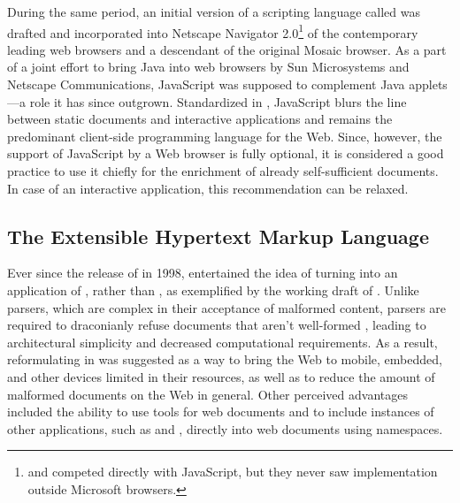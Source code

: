 \begin{figure}
\end{figure}

During the same period, an initial version of a scripting language called
 \cite{ecma97} was drafted and incorporated into Netscape
Navigator 2.0\footnote{
   and  competed directly with JavaScript, but they
  never saw implementation outside Microsoft browsers.
} of the contemporary leading web browsers and a descendant of the original
Mosaic browser. As a part of a joint effort to bring Java into web browsers by
Sun Microsystems and Netscape Communications, JavaScript was supposed to
complement Java applets \cite{netscape95}---a role it has since outgrown.
Standardized in \citeyear{ecma97}, JavaScript blurs the line between static
documents and interactive applications and remains the predominant client-side
programming language for the Web. Since, however, the support of JavaScript by a
Web browser is fully optional, it is considered a good practice to use it
chiefly for the enrichment of already self-sufficient  documents.
In case of an interactive application, this recommendation can be relaxed.

\subsection{The Extensible Hypertext Markup Language}
Ever since the release of  in 1998,  entertained the
idea of turning  into an application of , rather than
, as exemplified by the working draft of .
Unlike  parsers, which are complex in their acceptance of
malformed content,  parsers are required to draconianly refuse
 documents that aren't well-formed \cite[Section~1.2,
Terminology]{bray98}, leading to architectural simplicity and decreased
computational requirements. As a result, reformulating  in
 was suggested as a way to bring the Web to mobile, embedded, and
other devices limited in their resources, as well as to reduce the amount of
malformed documents on the Web in general. Other perceived advantages included
the ability to use  tools for web documents and to include
instances of other  applications, such as  and
, directly into web documents using  namespaces.


